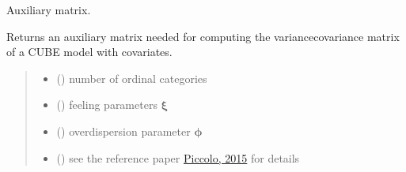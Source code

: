 \documentclass[letterpaper,10pt,english]{sphinxmanual}
\begin{document}
\begin{fulllineitems}
\begin{quote}
\begin{description}
\begin{itemize}
\end{itemize}

\end{description}\end{quote}

\end{fulllineitems}


\begin{fulllineitems}
\label{\detokenize{cubmods:cubmods.cube_ywz.auxmat}}
\pysigstartsignatures
{}
\pysigstopsignatures
\sphinxAtStartPar
Auxiliary matrix.

\sphinxAtStartPar
Returns an auxiliary matrix needed for computing the variance\sphinxhyphen{}covariance matrix of a CUBE model with covariates.
\begin{quote}\begin{description}
\begin{itemize}
\item {} 
\sphinxAtStartPar
{} () \textendash{} number of ordinal categories

\item {} 
\sphinxAtStartPar
{} () \textendash{} feeling parameters \(\pmb\xi\)

\item {} 
\sphinxAtStartPar
{} () \textendash{} overdispersion parameter \(\pmb\phi\)

\item {} 
\sphinxAtStartPar
{}\sphinxstyleliteralstrong{\sphinxupquote{,}}\sphinxstyleliteralstrong{\sphinxupquote{,}}\sphinxstyleliteralstrong{\sphinxupquote{,}}\sphinxstyleliteralstrong{\sphinxupquote{,}} () \textendash{} see the reference paper \hyperlink{cite.references:id14}{Piccolo, 2015} for details


\end{itemize}
\end{description}
\end{quote}
\end{fulllineitems}
\end{document}
